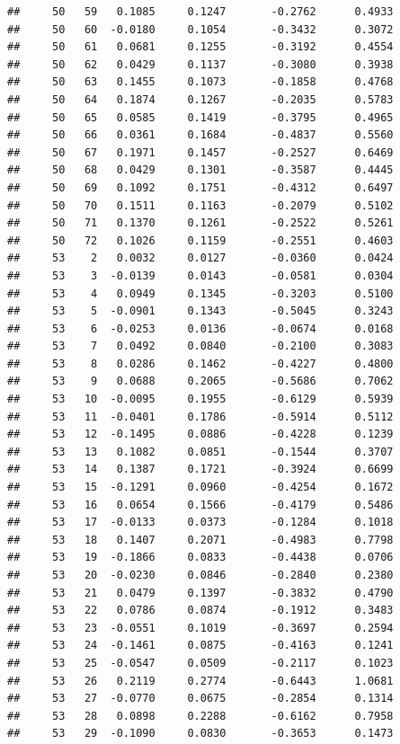 \documentclass[
]{article}
\begin{document}
\begin{verbatim}
##     50   59   0.1085     0.1247       -0.2762      0.4933  
##     50   60  -0.0180     0.1054       -0.3432      0.3072  
##     50   61   0.0681     0.1255       -0.3192      0.4554  
##     50   62   0.0429     0.1137       -0.3080      0.3938  
##     50   63   0.1455     0.1073       -0.1858      0.4768  
##     50   64   0.1874     0.1267       -0.2035      0.5783  
##     50   65   0.0585     0.1419       -0.3795      0.4965  
##     50   66   0.0361     0.1684       -0.4837      0.5560  
##     50   67   0.1971     0.1457       -0.2527      0.6469  
##     50   68   0.0429     0.1301       -0.3587      0.4445  
##     50   69   0.1092     0.1751       -0.4312      0.6497  
##     50   70   0.1511     0.1163       -0.2079      0.5102  
##     50   71   0.1370     0.1261       -0.2522      0.5261  
##     50   72   0.1026     0.1159       -0.2551      0.4603  
##     53    2   0.0032     0.0127       -0.0360      0.0424  
##     53    3  -0.0139     0.0143       -0.0581      0.0304  
##     53    4   0.0949     0.1345       -0.3203      0.5100  
##     53    5  -0.0901     0.1343       -0.5045      0.3243  
##     53    6  -0.0253     0.0136       -0.0674      0.0168  
##     53    7   0.0492     0.0840       -0.2100      0.3083  
##     53    8   0.0286     0.1462       -0.4227      0.4800  
##     53    9   0.0688     0.2065       -0.5686      0.7062  
##     53   10  -0.0095     0.1955       -0.6129      0.5939  
##     53   11  -0.0401     0.1786       -0.5914      0.5112  
##     53   12  -0.1495     0.0886       -0.4228      0.1239  
##     53   13   0.1082     0.0851       -0.1544      0.3707  
##     53   14   0.1387     0.1721       -0.3924      0.6699  
##     53   15  -0.1291     0.0960       -0.4254      0.1672  
##     53   16   0.0654     0.1566       -0.4179      0.5486  
##     53   17  -0.0133     0.0373       -0.1284      0.1018  
##     53   18   0.1407     0.2071       -0.4983      0.7798  
##     53   19  -0.1866     0.0833       -0.4438      0.0706  
##     53   20  -0.0230     0.0846       -0.2840      0.2380  
##     53   21   0.0479     0.1397       -0.3832      0.4790  
##     53   22   0.0786     0.0874       -0.1912      0.3483  
##     53   23  -0.0551     0.1019       -0.3697      0.2594  
##     53   24  -0.1461     0.0875       -0.4163      0.1241  
##     53   25  -0.0547     0.0509       -0.2117      0.1023  
##     53   26   0.2119     0.2774       -0.6443      1.0681  
##     53   27  -0.0770     0.0675       -0.2854      0.1314  
##     53   28   0.0898     0.2288       -0.6162      0.7958  
##     53   29  -0.1090     0.0830       -0.3653      0.1473  

\end{verbatim}
\end{document}
